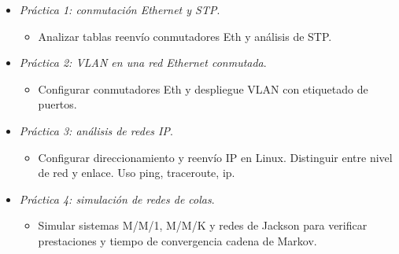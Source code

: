 \documentclass[xcolor=table,xcolor=x11names]{beamer}
\begin{document}
\begin{frame}{\subsecname}


\begin{itemize}

    \item \emph{Práctica 1: conmutación Ethernet y STP}.
        \begin{itemize}
                \item Analizar tablas reenvío conmutadores Eth y análisis de STP.
    \end{itemize}
 
    \item \emph{Práctica 2: VLAN en una red Ethernet conmutada}.
        \begin{itemize}
            \item Configurar conmutadores Eth y despliegue
                VLAN con etiquetado de puertos.
        \end{itemize}

    \item \emph{Práctica 3: análisis de redes IP}.
        \begin{itemize}
            \item Configurar direccionamiento y reenvío IP
                en Linux. Distinguir entre nivel de red y enlace.
                Uso ping, traceroute, ip.
        \end{itemize}

    \item \emph{Práctica 4: simulación de redes de colas}.
        \begin{itemize}
            \item Simular sistemas M/M/1, M/M/K y redes
                de Jackson para
                verificar prestaciones y tiempo de convergencia
                cadena de Markov.
        \end{itemize}
  

\end{itemize}
\end{frame}
\end{document}
